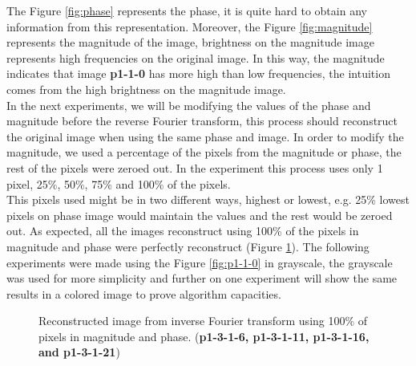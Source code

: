 \documentclass[12pt,a4paper]{article}
\begin{document}
The Figure \ref{fig:phase} represents the phase, it is quite hard to obtain any information from this representation. Moreover, the Figure \ref{fig:magnitude} represents the magnitude of the image, brightness on the magnitude image represents high frequencies on the original image. In this way, the magnitude indicates that image \textbf{p1-1-0} has more high than low frequencies, the intuition comes from the high brightness on the magnitude image. \\

In the next experiments, we will be modifying the values of the phase and magnitude before the reverse Fourier transform, this process should reconstruct the original image when using the same phase and image. In order to modify the magnitude, we used a percentage of the pixels from the magnitude or phase, the rest of the pixels were zeroed out. In the experiment this process uses only 1 pixel, 25\%, 50\%, 75\% and 100\% of the pixels. \\

This pixels used might be in two different ways, highest or lowest, e.g. 25\% lowest pixels on phase image would maintain the values and the rest would be zeroed out. As expected, all the images reconstruct using 100\% of the pixels in magnitude and phase were perfectly reconstruct (Figure \ref{fig:inverse}). The following experiments were made using the Figure \ref{fig:p1-1-0} in grayscale, the grayscale was used for more simplicity and further on one experiment will show the same results in a colored image to prove algorithm capacities. \\


\begin{figure}[!h]
	\centering
	{%
		\setlength{\fboxsep}{1pt}%
		\setlength{\fboxrule}{1pt}%
	}%
	\caption{Reconstructed image from inverse Fourier transform using 100\% of pixels in magnitude and phase. (\textbf{p1-3-1-6, p1-3-1-11, p1-3-1-16, and p1-3-1-21})}
	\label{fig:inverse}
\end{figure}
\end{document}
